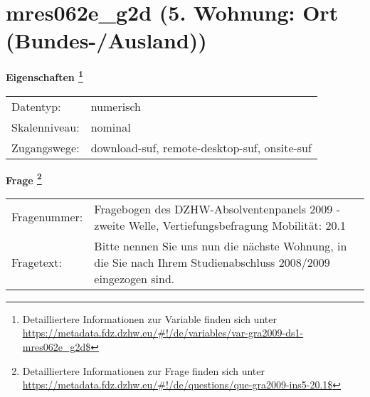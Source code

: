
    \setcounter{footnote}{0}

    \vspace*{-1.8cm}
	\section{mres062e\_g2d (5. Wohnung: Ort (Bundes-/Ausland))}
	\label{section:mres062e_g2d}



    \vspace*{0.5cm}
    \noindent\textbf{Eigenschaften
	\footnote{Detailliertere Informationen zur Variable finden sich unter
		\url{https://metadata.fdz.dzhw.eu/\#!/de/variables/var-gra2009-ds1-mres062e_g2d$}}}\\
	\begin{tabularx}{\hsize}{@{}lX}
	Datentyp: & numerisch \\
	Skalenniveau: & nominal \\
	Zugangswege: &
	  download-suf, 
	  remote-desktop-suf, 
	  onsite-suf
 \\
    \end{tabularx}



				\vspace*{0.5cm}
                \noindent\textbf{Frage
	                \footnote{Detailliertere Informationen zur Frage finden sich unter
		              \url{https://metadata.fdz.dzhw.eu/\#!/de/questions/que-gra2009-ins5-20.1$}}}\\
				\begin{tabularx}{\hsize}{@{}lX}
					Fragenummer: &
					  Fragebogen des DZHW-Absolventenpanels 2009 - zweite Welle, Vertiefungsbefragung Mobilität:
					  20.1
 \\
					Fragetext: & Bitte nennen Sie uns nun die nächste Wohnung, in die Sie nach Ihrem Studienabschluss 2008/2009 eingezogen sind. \\
				\end{tabularx}





